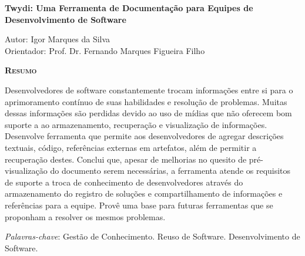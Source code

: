 \begin{center}
	{\Large{\textbf{Twydi: Uma Ferramenta de Documentação para Equipes de Desenvolvimento de Software}}}
\end{center}

\vspace{1cm}

\begin{flushright}
	Autor: Igor Marques da Silva\\
	Orientador: Prof. Dr. Fernando Marques Figueira Filho
\end{flushright}

\vspace{1cm}

\begin{center}
	\Large{\textsc{\textbf{Resumo}}}
\end{center}

\noindent Desenvolvedores de software constantemente trocam informações entre si para o aprimoramento contínuo de suas habilidades e resolução de problemas. Muitas dessas informações são perdidas devido ao uso de mídias que não oferecem bom suporte a ao armazenamento, recuperação e visualização de informações.
Desenvolve ferramenta que permite aos desenvolvedores de agregar descrições textuais, código, referências externas em artefatos, além de permitir a recuperação destes. Conclui que, apesar de melhorias no quesito de pré-visualização do documento serem necessárias, a ferramenta atende os requisitos de suporte a troca de conhecimento de desenvolvedores através do armazenamento do registro de soluções e compartilhamento de informações e  referências para a equipe. Provê uma base para futuras ferramentas que se proponham a resolver os mesmos problemas.

\noindent\textit{Palavras-chave}: Gestão de Conhecimento. Reuso de Software. Desenvolvimento de Software.
